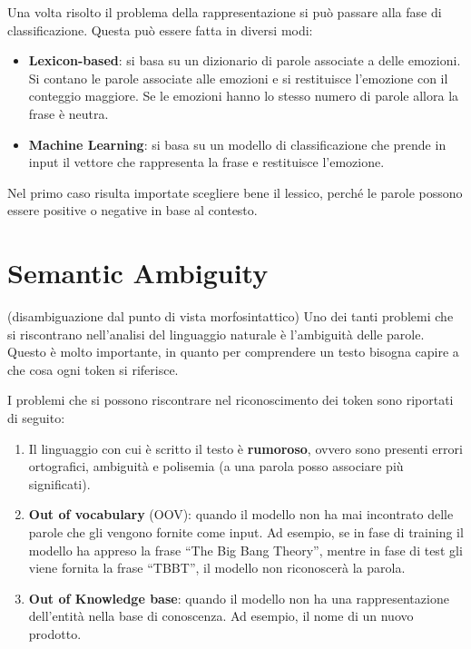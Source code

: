 Una volta risolto il problema della rappresentazione si può passare alla fase
di classificazione. Questa può essere fatta in diversi modi:
\begin{itemize}
      \item \textbf{Lexicon-based}: si basa su un dizionario di parole associate
            a delle emozioni. Si contano le parole associate alle emozioni e si
            restituisce l'emozione con il conteggio maggiore. Se le emozioni hanno
            lo stesso numero di parole allora la frase è neutra.
      \item \textbf{Machine Learning}: si basa su un modello di classificazione
            che prende in input il vettore che rappresenta la frase e restituisce
            l'emozione.
\end{itemize}
\begin{nota}
      Nel primo caso risulta importate scegliere bene il lessico, perché le parole
      possono essere positive o negative in base al contesto.
\end{nota}
\section{Semantic Ambiguity}
 (disambiguazione dal punto di vista morfosintattico)
Uno dei tanti problemi che si riscontrano nell'analisi del linguaggio naturale
è l'ambiguità delle parole. Questo è molto importante, in quanto per comprendere
un testo bisogna capire a che cosa ogni token si riferisce.

I problemi che si possono riscontrare nel riconoscimento dei token sono riportati
di seguito:
\begin{enumerate}
      \item Il linguaggio con cui è scritto il testo è \textbf{rumoroso}, ovvero
            sono presenti errori ortografici, ambiguità e polisemia (a una parola
            posso associare più significati).
      \item \textbf{Out of vocabulary} (OOV): quando il modello non ha mai
            incontrato delle parole che gli vengono fornite come input. Ad esempio,
            se in fase di training il modello ha appreso la frase ``The Big Bang
            Theory'', mentre in fase di test gli viene fornita la frase ``TBBT'',
            il modello non riconoscerà la parola.
      \item \textbf{Out of Knowledge base}: quando il modello non ha una
            rappresentazione dell'entità nella base di conoscenza. Ad esempio,
            il nome di un nuovo prodotto.
\end{enumerate}
